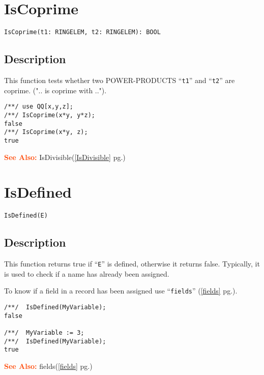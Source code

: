 \documentclass[a4paper]{mybook}
\newenvironment{command}{}{} %
\newcommand\SeeAlso{\par\textcolor{OrangeRed}{\textbf{\large See Also: }}}
\begin{document}
\section{IsCoprime}
\label{IsCoprime}
\begin{command} %


\begin{Verbatim}[label=syntax, rulecolor=\color{MidnightBlue},
frame=single]
IsCoprime(t1: RINGELEM, t2: RINGELEM): BOOL
\end{Verbatim}


\subsection*{Description}

This function tests whether two POWER-PRODUCTS ``\verb&t1&'' and ``\verb&t2&''
are coprime.  (".. is coprime with ..").
\begin{Verbatim}[label=example, rulecolor=\color{PineGreen}, frame=single]
/**/ use QQ[x,y,z];
/**/ IsCoprime(x*y, y*z);
false
/**/ IsCoprime(x*y, z);
true
\end{Verbatim}


\SeeAlso %
  IsDivisible(\ref{IsDivisible} pg.\pageref{IsDivisible})
\end{command} %

\section{IsDefined}
\label{IsDefined}
\begin{command} %


\begin{Verbatim}[label=syntax, rulecolor=\color{MidnightBlue},
frame=single]
IsDefined(E)
\end{Verbatim}


\subsection*{Description}

This function returns true if ``\verb&E&'' is defined, otherwise it returns false.
Typically, it is used to check if a name has already been assigned.
\par 
To know if a field in a record has been assigned use ``\verb&fields&'' (\ref{fields} pg.\pageref{fields}).
\begin{Verbatim}[label=example, rulecolor=\color{PineGreen}, frame=single]
/**/  IsDefined(MyVariable);
false

/**/  MyVariable := 3;
/**/  IsDefined(MyVariable);
true
\end{Verbatim}


\SeeAlso %
  fields(\ref{fields} pg.\pageref{fields})
\end{command} %
\end{document}
